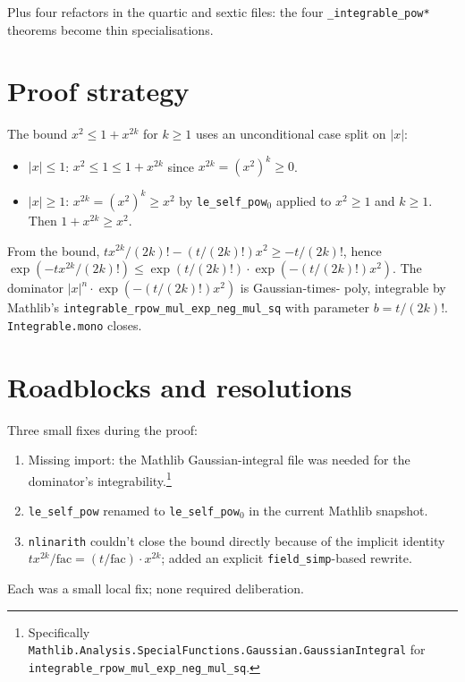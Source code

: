 \documentclass[11pt]{article}
\begin{document}
Plus four refactors in the quartic and sextic files: the four
\texttt{\_integrable\_pow*} theorems become thin specialisations.

\section{Proof strategy}

The bound $x^2 \le 1 + x^{2k}$ for $k \ge 1$ uses an unconditional
case split on $|x|$:

\begin{itemize}[leftmargin=1.5em]
\item \emph{$|x| \le 1$}: $x^2 \le 1 \le 1 + x^{2k}$ since
  $x^{2k} = (x^2)^k \ge 0$.
\item \emph{$|x| \ge 1$}: $x^{2k} = (x^2)^k \ge x^2$ by
  \texttt{le\_self\_pow$_0$} applied to $x^2 \ge 1$ and $k \ge 1$.
  Then $1 + x^{2k} \ge x^2$.
\end{itemize}

From the bound, $t x^{2k}/(2k)! - (t/(2k)!) x^2 \ge -t/(2k)!$, hence
$\exp(-tx^{2k}/(2k)!) \le \exp(t/(2k)!) \cdot \exp(-(t/(2k)!) x^2)$.
The dominator $|x|^n \cdot \exp(-(t/(2k)!) x^2)$ is Gaussian-times-
poly, integrable by Mathlib's
\texttt{integrable\_rpow\_mul\_exp\_neg\_mul\_sq} with parameter
$b = t/(2k)!$. \texttt{Integrable.mono} closes.

\section{Roadblocks and resolutions}

Three small fixes during the proof:

\begin{enumerate}[leftmargin=1.5em]
\item Missing import: the Mathlib Gaussian-integral file was needed
  for the dominator's integrability.\footnote{Specifically
  \texttt{Mathlib.Analysis.SpecialFunctions.Gaussian.GaussianIntegral}
  for \texttt{integrable\_rpow\_mul\_exp\_neg\_mul\_sq}.}
\item \texttt{le\_self\_pow} renamed to
  \texttt{le\_self\_pow$_0$} in the current Mathlib snapshot.
\item \texttt{nlinarith} couldn't close the bound directly because of
  the implicit identity $t x^{2k} / \mathrm{fac} = (t/\mathrm{fac})
  \cdot x^{2k}$; added an explicit \texttt{field\_simp}-based
  rewrite.
\end{enumerate}

Each was a small local fix; none required deliberation.
\end{document}
